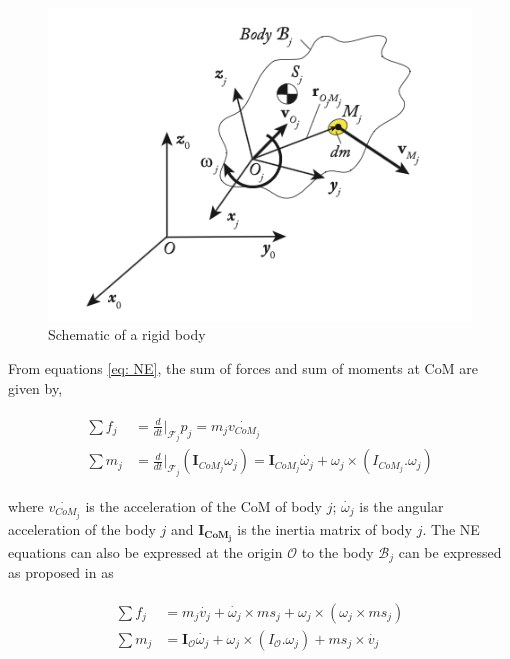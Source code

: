 \begin{figure}[h!]
    \centering
    \includegraphics[scale=0.55]{images/rigid-body.png}\hfill
    \caption{Schematic of a rigid body}\hfill
    \label{fig: rigid-body}
\end{figure}

From equations \ref{eq: NE}, the sum of forces and sum of moments at CoM are given by,

\begin{align}
    \begin{split}
        \sum f_j &= \frac{d}{dt}|_{\mathcal{F}_j}p_j 
                = m_j\dot{v_{CoM_j}} \\
        \sum m_j &= \frac{d}{dt}|_{\mathcal{F}_j} (\mathbf{I}_{CoM_j} \omega_j) 
                =\mathbf{I}_{CoM_j}\dot{\omega_j} + \omega_j \times (I_{CoM_j}.\omega_j)
    \end{split}
\end{align}

where $\dot{v_{CoM_j}}$ is the acceleration of the CoM of body $j$; $\dot{\omega_j}$ is the angular acceleration of the body $j$ and 
$\mathbf{I_{CoM_j}}$ is the inertia matrix of body $j$. The NE equations can also be expressed at the origin $\mathcal{O}$ to the body 
$\mathcal{B}_j$ can be expressed as proposed in \cite{khalil2004modeling} as


\begin{align}
    \begin{split}
        \sum f_j &= m_j\dot{v_j} + \dot{\omega_j} \times ms_j + \omega_j \times (\omega_j \times ms_j)\\
        \sum m_j &= \mathbf{I}_{\mathcal{O}}\dot{\omega_j} + \omega_j \times (I_{\mathcal{O}}.\omega_j) + ms_j \times \dot{v_j}
    \end{split}
    \label{eq: NE-rigid-origin}
\end{align}

